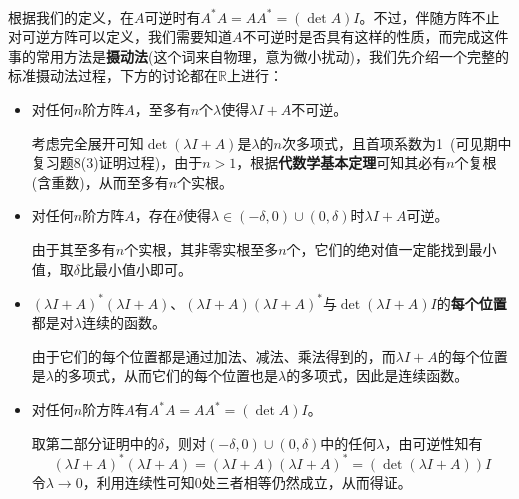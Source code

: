 \documentclass[a4paper,UTF8,fontset=windows]{ctexart}
\begin{document}
\

根据我们的定义，在$A$可逆时有$A^*A=AA^*=(\det A)I$。不过，伴随方阵不止对可逆方阵可以定义，我们需要知道$A$不可逆时是否具有这样的性质，而完成这件事的常用方法是\textbf{摄动法}(这个词来自物理，意为微小扰动)，我们先介绍一个完整的标准摄动法过程，下方的讨论都在$\mathbb{R}$上进行：
\begin{itemize}
    \item 对任何$n$阶方阵$A$，至多有$n$个$\lambda$使得$\lambda I+A$不可逆。
    
    考虑完全展开可知$\det(\lambda I+A)$是$\lambda$的$n$次多项式，且首项系数为1\ (可见期中复习题8(3)证明过程)，由于$n>1$，根据\textbf{代数学基本定理}可知其必有$n$个复根(含重数)，从而至多有$n$个实根。
    
    \item 对任何$n$阶方阵$A$，存在$\delta$使得$\lambda\in(-\delta,0)\cup(0,\delta)$时$\lambda I+A$可逆。
    
    由于其至多有$n$个实根，其非零实根至多$n$个，它们的绝对值一定能找到最小值，取$\delta$比最小值小即可。
    
    \item $(\lambda I+A)^*(\lambda I+A)$、$(\lambda I+A)(\lambda I+A)^*$与$\det(\lambda I+A)I$的\textbf{每个位置}都是对$\lambda$连续的函数。
    
    由于它们的每个位置都是通过加法、减法、乘法得到的，而$\lambda I+A$的每个位置是$\lambda$的多项式，从而它们的每个位置也是$\lambda$的多项式，因此是连续函数。
    
    \item 对任何$n$阶方阵$A$有$A^*A=AA^*=(\det A)I$。
    
    取第二部分证明中的$\delta$，则对$(-\delta,0)\cup(0,\delta)$中的任何$\lambda$，由可逆性知有
    $$(\lambda I+A)^*(\lambda I+A)=(\lambda I+A)(\lambda I+A)^*=(\det(\lambda I+A))I$$
    令$\lambda\to0$，利用连续性可知0处三者相等仍然成立，从而得证。
\end{itemize}
\end{document}
